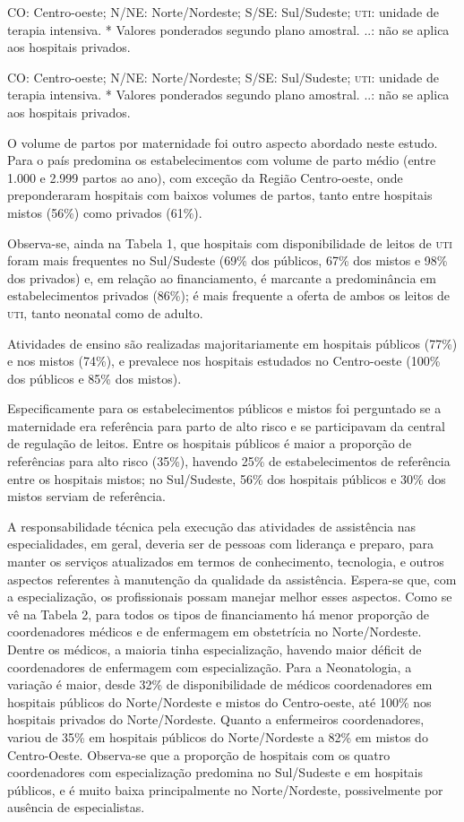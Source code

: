 \documentclass{article}
\begin{document}
CO: Centro-oeste; N/NE: Norte/Nordeste; S/SE: Sul/Sudeste; \textsc{uti}:
unidade de terapia intensiva. * Valores ponderados segundo plano
amostral. ..: não se aplica aos hospitais privados.

CO: Centro-oeste; N/NE: Norte/Nordeste; S/SE: Sul/Sudeste; \textsc{uti}:
unidade de terapia intensiva. * Valores ponderados segundo plano
amostral. ..: não se aplica aos hospitais privados.

O volume de partos por maternidade foi outro aspecto abordado neste estudo. Para
o
país predomina os estabelecimentos com volume de parto médio (entre 1.000 e
2.999
partos ao ano), com exceção da Região Centro-oeste, onde preponderaram hospitais
com
baixos volumes de partos, tanto entre hospitais mistos (56\%) como privados
(61\%).

Observa-se, ainda na Tabela 1, que hospitais
com disponibilidade de leitos de \textsc{uti} foram mais frequentes no Sul/Sudeste (69\%
dos
públicos, 67\% dos mistos e 98\% dos privados) e, em relação ao financiamento, é
marcante a predominância em estabelecimentos privados (86\%); é mais frequente a
oferta de ambos os leitos de \textsc{uti}, tanto neonatal como de adulto.

Atividades de ensino são realizadas majoritariamente em hospitais públicos
(77\%) e
nos mistos (74\%), e prevalece nos hospitais estudados no Centro-oeste (100\%
dos
públicos e 85\% dos mistos).

Especificamente para os estabelecimentos públicos e mistos foi perguntado se a
maternidade era referência para parto de alto risco e se participavam da central
de
regulação de leitos. Entre os hospitais públicos é maior a proporção de
referências
para alto risco (35\%), havendo 25\% de estabelecimentos de referência entre os
hospitais mistos; no Sul/Sudeste, 56\% dos hospitais públicos e 30\% dos mistos
serviam de referência.

A responsabilidade técnica pela execução das atividades de assistência nas
especialidades, em geral, deveria ser de pessoas com liderança e preparo, para
manter os serviços atualizados em termos de conhecimento, tecnologia, e outros
aspectos referentes à manutenção da qualidade da assistência. Espera-se que, com
a
especialização, os profissionais possam manejar melhor esses aspectos. Como se
vê na
Tabela 2, para todos os tipos de
financiamento há menor proporção de coordenadores médicos e de enfermagem em
obstetrícia no Norte/Nordeste. Dentre os médicos, a maioria tinha
especialização,
havendo maior déficit de coordenadores de enfermagem com especialização. Para a
Neonatologia, a variação é maior, desde 32\% de disponibilidade de médicos
coordenadores em hospitais públicos do Norte/Nordeste e mistos do Centro-oeste,
até
100\% nos hospitais privados do Norte/Nordeste. Quanto a enfermeiros
coordenadores,
variou de 35\% em hospitais públicos do Norte/Nordeste a 82\% em mistos do
Centro-Oeste. Observa-se que a proporção de hospitais com os quatro
coordenadores
com especialização predomina no Sul/Sudeste e em hospitais públicos, e é muito
baixa
principalmente no Norte/Nordeste, possivelmente por ausência de especialistas.
\end{document}
